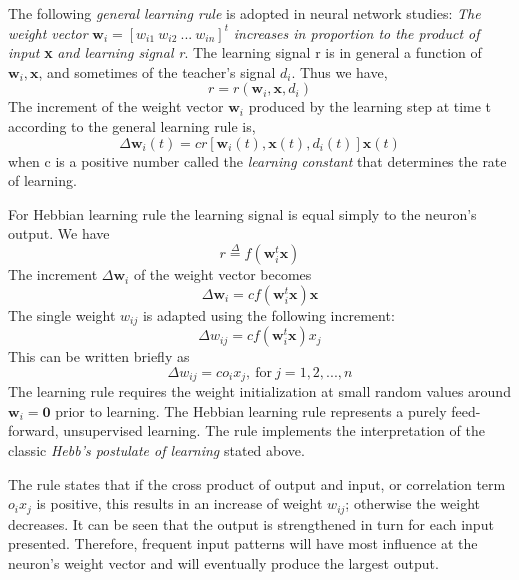 The following \textit{general learning rule} is adopted in neural network studies: \textit{The weight vector} \( \textbf{w}_i = [w_{i1} \> w_{i2} \> ... \> w_{in}]^t \) \textit{increases in proportion to the product of input} \textbf{x} \textit{and learning signal r}. The learning signal r is in general a function of \(\textbf{w}_i,\textbf{x}\), and sometimes of the teacher's signal \(d_i\). Thus we have, 
\begin{equation}
	r = r(\textbf{w}_i,\textbf{x},d_i)
\end{equation}
The increment of the weight vector \(\textbf{w}_i\) produced by the learning step at time t according to the general learning rule is,
\begin{equation}
	\Delta\textbf{w}_i(t)=cr[\textbf{w}_i(t),\textbf{x}(t),d_i(t)]\textbf{x}(t)
\end{equation}
when c is a positive number called the \textit{learning constant} that determines the rate of learning.

For Hebbian learning rule the learning signal is equal simply to the neuron's output. We have
\begin{equation}
	r \overset{\Delta}{=} f(\textbf{w}_i^t \textbf{x})
\end{equation}
The increment \(\Delta\textbf{w}_i\) of the weight vector becomes
\begin{equation}
	\Delta\textbf{w}_i = cf(\textbf{w}_i^t \textbf{x})\textbf{x}
\end{equation}
The single weight \( w_{ij} \) is adapted using the following increment:
\begin{equation}
	\Delta\textit{w}_{ij} = cf(\textbf{w}_i^t \textbf{x})x_j
\end{equation}
This can be written briefly as 
\begin{equation}
	\Delta\textit{w}_{ij} = c o_i x_j, \> \text{for} \> j = 1, 2, ..., n
\end{equation}
The learning rule requires the weight initialization at small random values around \( \textbf{w}_i = \textbf{0}\) prior to learning. The Hebbian learning rule represents a purely feed-forward, unsupervised learning. The rule implements the interpretation of the classic \textit{Hebb's postulate of learning} stated above. 

The rule states that if the cross product of output and input, or correlation term \(o_ix_j\) is positive, this results in an increase of weight \(w_{ij}\); otherwise the weight decreases. It can be seen that the output is strengthened in turn for each input presented. Therefore, frequent input patterns will have most influence at the neuron's weight vector and will eventually produce the largest output.


